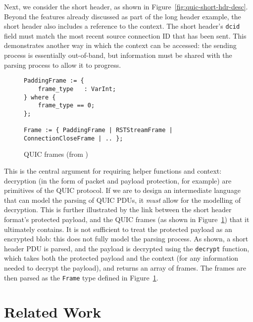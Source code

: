 \documentclass[10pt,sigconf]{acmart}
\begin{document}
Next, we consider the short header, as shown in Figure~\ref{fig:quic-short-hdr-desc}.
Beyond the features already discussed as part of the long header example, the short header
also includes a reference to the context. The short header's \texttt{dcid} field must
match the most recent source connection ID that has been sent. This demonstrates another
way in which the context can be accessed: the sending process is essentially out-of-band,
but information must be shared with the parsing process to allow it to progress.

\begin{figure}
	\vspace{3mm}
    \begin{BVerbatim}[fontsize=\scriptsize]
PaddingFrame := {
	frame_type   : VarInt;
} where {
	frame_type == 0;
};

Frame := { PaddingFrame | RSTStreamFrame | ConnectionCloseFrame | .. };
    \end{BVerbatim}
    \caption{QUIC frames (from \cite{draft-ietf-quic-transport-latest})}
    \label{fig:quic-frame-desc}
\end{figure}

This is the central argument for requiring helper functions and context: decryption (in
the form of packet and payload protection, for example) are primitives of the QUIC
protocol. If we are to design an intermediate language that can model the parsing of QUIC
PDUs, it \emph{must} allow for the modelling of decryption. This is further illustrated
by the link between the short header format's protected payload, and the QUIC frames (as
shown in Figure~\ref{fig:quic-frame-desc}) that it ultimately contains. It is not sufficient
to treat the protected payload as an encrypted blob: this does not fully model the parsing
process. As shown, a short header PDU is parsed, and the payload is decrypted using the
\texttt{decrypt} function, which takes both the protected payload and the context (for any
information needed to decrypt the payload), and returns an array of frames. The frames are
then parsed as the \texttt{Frame} type defined in Figure~\ref{fig:quic-frame-desc}.

\section{Related Work}
\label{sec:related}
\end{document}
